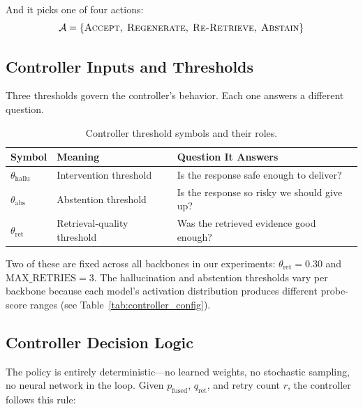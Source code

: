 And it picks one of four actions:
\[
    \mathcal{A} = \{\textsc{Accept},\; \textsc{Regenerate},\; \textsc{Re-Retrieve},\; \textsc{Abstain}\}
\]

\subsection{Controller Inputs and Thresholds}
\label{sec:controller_inputs}

Three thresholds govern the controller's behavior. Each one answers a different question.

\begin{table}[!htb]
\centering
\caption{Controller threshold symbols and their roles.}
\label{tab:threshold_symbols}
\begin{tabular}{@{}lll@{}}
\toprule
\textbf{Symbol} & \textbf{Meaning} & \textbf{Question It Answers} \\
\midrule
$\theta_{\text{hallu}}$ & Intervention threshold & Is the response safe enough to deliver? \\
$\theta_{\text{abs}}$   & Abstention threshold  & Is the response so risky we should give up? \\
$\theta_{\text{ret}}$   & Retrieval-quality threshold & Was the retrieved evidence good enough? \\
\bottomrule
\end{tabular}
\end{table}

Two of these are fixed across all backbones in our experiments: $\theta_{\text{ret}} = 0.30$ and $\text{MAX\_RETRIES} = 3$. The hallucination and abstention thresholds vary per backbone because each model's activation distribution produces different probe-score ranges (see Table~\ref{tab:controller_config}).

\subsection{Controller Decision Logic}
\label{sec:controller_logic}

The policy is entirely deterministic---no learned weights, no stochastic sampling, no neural network in the loop. Given $p_{\text{fused}}$, $q_{\text{ret}}$, and retry count $r$, the controller follows this rule:

